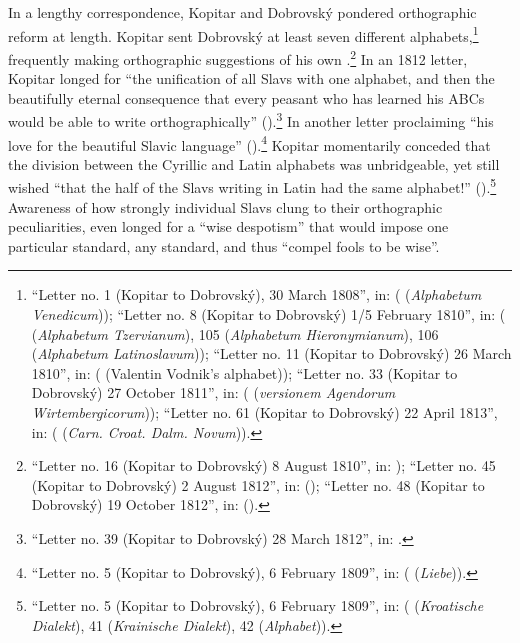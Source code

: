 In a lengthy correspondence, Kopitar and Dobrovský pondered orthographic reform at length. Kopitar sent Dobrovský at least seven different alphabets,\footnote{“Letter no. 1 (Kopitar to Dobrovský), 30 March 1808”, in: \citeauthor{jagic_pisma_1895} (\citeyear[6--7]{jagic_pisma_1895} (\textit{Alphabetum Venedicum})); “Letter no. 8 (Kopitar to Dobrovský) 1/5 February 1810”, in: (\citeyear[103--104]{jagic_pisma_1895} (\textit{Alphabetum Tzervianum}), 105 (\textit{Alphabetum Hieronymianum}), 106 (\textit{Alphabetum Latinoslavum})); “Letter no. 11 (Kopitar to Dobrovský) 26 March 1810”, in: (\citeyear[130]{jagic_pisma_1895} (Valentin Vodnik’s alphabet)); “Letter no. 33 (Kopitar to Dobrovský) 27 October 1811”, in: (\citeyear[220]{jagic_pisma_1895} (\textit{versionem Agendorum Wirtembergicorum})); “Letter no. 61 (Kopitar to Dobrovský) 22 April 1813”, in: (\citeyear[332--333]{jagic_pisma_1895} (\textit{Carn. Croat. Dalm. Novum})).} frequently making orthographic suggestions of his own \citep[160--161, 163; 278; 291]{jagic_pisma_1895}.\footnote{“Letter no. 16 (Kopitar to Dobrovský) 8 August 1810”, in: \citet[160--161, 163]{jagic_pisma_1895}); “Letter no. 45 (Kopitar to Dobrovský) 2 August 1812”, in: (\citeyear[278]{jagic_pisma_1895}); “Letter no. 48 (Kopitar to Dobrovský) 19 October 1812”, in: (\citeyear[291]{jagic_pisma_1895}).} In an 1812 letter, Kopitar longed for “the unification of all Slavs with one alphabet, and then the beautifully eternal consequence that every peasant who has learned his ABCs would be able to write orthographically” (\citeyear[251--252]{jagic_pisma_1895}).\footnote{“Letter no. 39 (Kopitar to Dobrovský) 28 March 1812”, in: \citet[251--252]{jagic_pisma_1895}.} In another letter proclaiming “his love for the beautiful Slavic language” (\citeyear[29]{jagic_pisma_1895}).\footnote{“Letter no. 5 (Kopitar to Dobrovský), 6 February 1809”, in: \citeauthor{jagic_pisma_1895} (\citeyear[29]{jagic_pisma_1895} (\textit{Liebe})).} Kopitar momentarily conceded that the division between the Cyrillic and Latin alphabets was unbridgeable, yet still wished “that the half of the Slavs writing in Latin had the same alphabet!” (\citeyear[33, 41--42]{jagic_pisma_1895}).\footnote{“Letter no. 5 (Kopitar to Dobrovský), 6 February 1809”, in: \citeauthor{jagic_pisma_1895} (\citeyear[33]{jagic_pisma_1895} (\textit{Kroatische Dialekt}), 41 (\textit{Krainische Dialekt}), 42 (\textit{Alphabet})).} Awareness of how strongly individual Slavs clung to their orthographic peculiarities, \citet[92]{kopitar_patriotische_1810} even longed for a “wise despotism” that would impose one particular standard, any standard, and thus “compel fools to be wise”.

